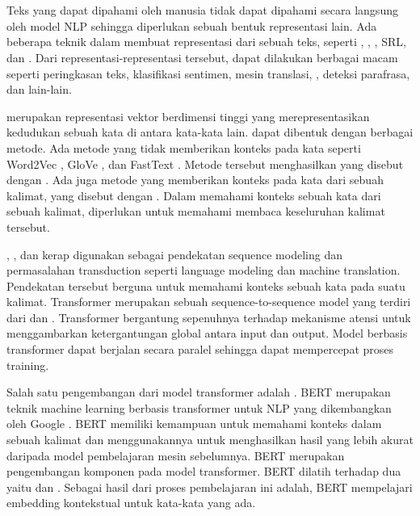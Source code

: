 \section{}

Teks yang dapat dipahami oleh manusia tidak dapat dipahami secara langsung oleh model \gls{NLP} sehingga diperlukan sebuah bentuk representasi lain.
Ada beberapa teknik dalam membuat representasi dari sebuah teks, seperti , , \wordem{}, \gls{SRL}, dan \AMR{}.
Dari representasi-representasi tersebut, dapat dilakukan berbagai macam  seperti peringkasan teks, klasifikasi sentimen, mesin translasi, , deteksi parafrasa, dan lain-lain.

\Wordem{} merupakan representasi vektor berdimensi tinggi yang merepresentasikan kedudukan sebuah kata di antara kata-kata lain.
\Wordem{} dapat dibentuk dengan berbagai metode.
Ada metode yang tidak memberikan konteks pada kata seperti Word2Vec , GloVe , dan FastText .
Metode tersebut menghasilkan yang disebut dengan  \wordem{}.
Ada juga metode yang memberikan konteks pada kata dari sebuah kalimat, yang disebut dengan  \wordem{}.
Dalam memahami konteks sebuah kata dari sebuah kalimat, diperlukan untuk memahami membaca keseluruhan kalimat tersebut.

, , dan  kerap digunakan sebagai pendekatan sequence modeling dan permasalahan transduction seperti language modeling dan machine translation.
Pendekatan tersebut berguna untuk memahami konteks sebuah kata pada suatu kalimat.
Transformer merupakan sebuah sequence-to-sequence model yang terdiri dari  dan  .
Transformer bergantung sepenuhnya terhadap mekanisme atensi untuk menggambarkan ketergantungan global antara input dan output.
Model berbasis transformer dapat berjalan secara paralel sehingga dapat mempercepat proses training.

Salah satu pengembangan  dari model transformer adalah .
\gls{BERT} merupakan teknik machine learning berbasis transformer untuk \gls{NLP} yang dikembangkan oleh Google .
\gls{BERT} memiliki kemampuan untuk memahami konteks dalam sebuah kalimat dan menggunakannya untuk menghasilkan hasil yang lebih akurat daripada model pembelajaran mesin sebelumnya.
\gls{BERT} merupakan pengembangan komponen  pada model transformer.
\gls{BERT} dilatih terhadap dua  yaitu  dan .
Sebagai hasil dari proses pembelajaran ini adalah, \gls{BERT} mempelajari embedding kontekstual untuk kata-kata yang ada.

